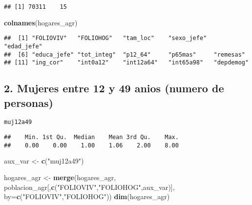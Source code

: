 \documentclass[11pt,]{article}
\newenvironment{Shaded}{\begin{snugshade}}{\end{snugshade}}
\newcommand{\KeywordTok}[1]{\textcolor[rgb]{0.13,0.29,0.53}{\textbf{#1}}}
\newcommand{\DataTypeTok}[1]{\textcolor[rgb]{0.13,0.29,0.53}{#1}}
\newcommand{\StringTok}[1]{\textcolor[rgb]{0.31,0.60,0.02}{#1}}
\newcommand{\CommentTok}[1]{\textcolor[rgb]{0.56,0.35,0.01}{\textit{#1}}}
\newcommand{\OperatorTok}[1]{\textcolor[rgb]{0.81,0.36,0.00}{\textbf{#1}}}
\newcommand{\NormalTok}[1]{#1}
\begin{document}
\begin{verbatim}
## [1] 70311    15
\end{verbatim}

\begin{Shaded}
\begin{Highlighting}[]
\KeywordTok{colnames}\NormalTok{(hogares_agr)}
\end{Highlighting}
\end{Shaded}

\begin{verbatim}
##  [1] "FOLIOVIV"   "FOLIOHOG"   "tam_loc"    "sexo_jefe"  "edad_jefe" 
##  [6] "educa_jefe" "tot_integ"  "p12_64"     "p65mas"     "remesas"   
## [11] "ing_cor"    "int0a12"    "int12a64"   "int65a98"   "depdemog"
\end{verbatim}

\subsection{2. Mujeres entre 12 y 49 anios (numero de
personas)}\label{mujeres-entre-12-y-49-anios-numero-de-personas}

\texttt{muj12a49}

\begin{Shaded}
\end{Shaded}

\begin{verbatim}
##    Min. 1st Qu.  Median    Mean 3rd Qu.    Max. 
##    0.00    0.00    1.00    1.06    2.00    8.00
\end{verbatim}

\begin{Shaded}
\begin{Highlighting}[]
\NormalTok{aux_var <-}\StringTok{ }\KeywordTok{c}\NormalTok{(}\StringTok{"muj12a49"}\NormalTok{)}

\NormalTok{hogares_agr <-}\StringTok{ }\KeywordTok{merge}\NormalTok{(hogares_agr,}
\NormalTok{                     poblacion_agr[,}\KeywordTok{c}\NormalTok{(}\StringTok{"FOLIOVIV"}\NormalTok{,}\StringTok{"FOLIOHOG"}\NormalTok{,aux_var)],}
                     \DataTypeTok{by=}\KeywordTok{c}\NormalTok{(}\StringTok{"FOLIOVIV"}\NormalTok{,}\StringTok{"FOLIOHOG"}\NormalTok{))}
\KeywordTok{dim}\NormalTok{(hogares_agr)}
\end{Highlighting}
\end{Shaded}
\end{document}
